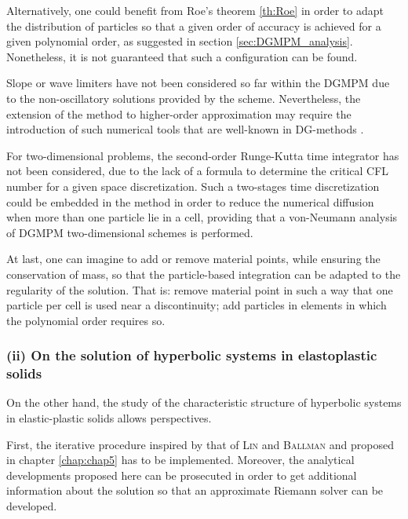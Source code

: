 Alternatively, one could benefit from Roe's theorem \ref{th:Roe} in order to adapt the distribution of particles so that a given order of accuracy is achieved for a given polynomial order, as suggested in section \ref{sec:DGMPM_analysis}.
Nonetheless, it is not guaranteed that such a configuration can be found.

Slope or wave limiters have not been considered so far within the DGMPM due to the non-oscillatory solutions provided by the scheme.
Nevertheless, the extension of the method to higher-order approximation may require the introduction of such numerical tools that are well-known in DG-methods \cite{Cockburn}.

For two-dimensional problems, the second-order Runge-Kutta time integrator has not been considered, due to the lack of a formula to determine the critical CFL number for a given space discretization.
Such a two-stages time discretization could be embedded in the method in order to reduce the numerical diffusion when more than one particle lie in a cell, providing that a von-Neumann analysis of DGMPM two-dimensional schemes is performed.

At last, one can imagine to add or remove material points, while ensuring the conservation of mass, so that the particle-based integration can be adapted to the regularity of the solution. 
That is: remove material point in such a way that one particle per cell is used near a discontinuity; add particles in elements in which the polynomial order requires so. 

\subsubsection*{(ii) On the solution of hyperbolic systems in elastoplastic solids}
On the other hand, the study of the characteristic structure of hyperbolic systems in elastic-plastic solids allows perspectives.

First, the iterative procedure inspired by that of \textsc{Lin} and \textsc{Ballman} \cite{Lin_et_Ballman} and proposed in chapter \ref{chap:chap5} has to be implemented.
Moreover, the analytical developments proposed here can be prosecuted in order to get additional information about the solution so that an approximate Riemann solver can be developed.

